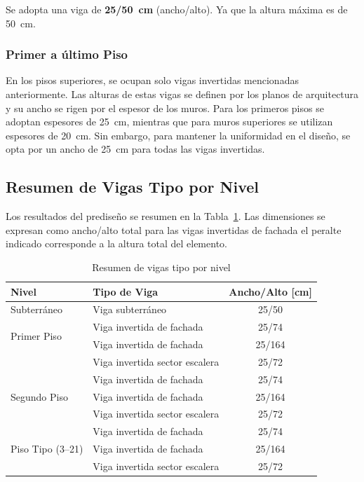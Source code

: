 Se adopta una viga de \textbf{25/50~cm} (ancho/alto). Ya que la altura máxima es de 50~cm.

\subsubsection{Primer a último Piso}
En los pisos superiores, se ocupan solo vigas invertidas mencionadas anteriormente. Las alturas de estas vigas se definen por los planos de arquitectura y su ancho se rigen por el espesor de los muros. Para los primeros pisos se adoptan espesores de 25~cm, mientras que para muros superiores se utilizan espesores de 20~cm. Sin embargo, para mantener la uniformidad en el diseño, se opta por un ancho de 25~cm para todas las vigas invertidas.
\newpage
\subsection{Resumen de Vigas Tipo por Nivel}

Los resultados del prediseño se resumen en la Tabla~\ref{tab:vigas_tipo}. 
Las dimensiones se expresan como ancho/alto total para las vigas 
invertidas de fachada el peralte indicado corresponde a la altura total 
del elemento.

\begin{table}[H]
    \centering
    \begin{tabular}{llc}
        \toprule
        \textbf{Nivel} & \textbf{Tipo de Viga} & \textbf{Ancho/Alto [cm]} \\
        \midrule
        Subterráneo 
            & Viga subterráneo & 25/50 \\
        \midrule
        \multirow{2}{*}{Primer Piso}
            & Viga invertida de fachada  & 25/74  \\
            & Viga invertida de fachada       & 25/164 \\
            & Viga invertida sector escalera & 25/72  \\
        \midrule
        \multirow{3}{*}{Segundo Piso}
            & Viga invertida de fachada  & 25/74  \\
            & Viga invertida de fachada      & 25/164 \\
            & Viga invertida sector escalera             & 25/72  \\
        \midrule
        \multirow{3}{*}{Piso Tipo (3--21)}
            & Viga invertida de fachada  & 25/74  \\
            & Viga invertida de fachada      & 25/164 \\
            & Viga invertida sector escalera             & 25/72  \\
        \bottomrule
    \end{tabular}
    \caption{Resumen de vigas tipo por nivel}
    \label{tab:vigas_tipo}
\end{table}
